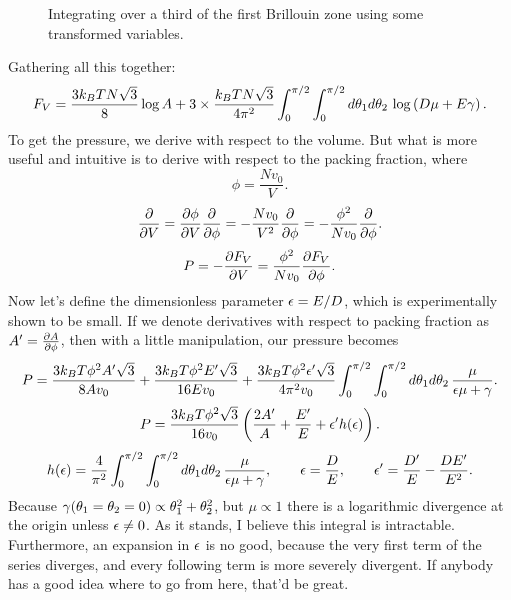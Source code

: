 \documentclass[12pt]{article}
\begin{document}
\begin{figure}
\centering
{}
\caption{Integrating over a third of the first Brillouin zone using some transformed variables.}
\end{figure}
Gathering all this together:
\[ F_V = \frac{3k_BTN\sqrt{3}}{8}\log A + 3\times \frac{k_BTN\sqrt{3}}{4\pi^2} \int_0^{\pi/2}\int_0^{\pi/2}d\theta_1 d\theta_2 \, \log\left(D\mu + E\gamma\right).\]
To get the pressure, we derive with respect to the volume. But what is more useful and intuitive is to derive with respect to the packing fraction, where
\[ \phi = \frac{Nv_0}{V}.\]
\[ \frac{\partial {}}{\partial {V}} = \frac{\partial {\phi}}{\partial {V}}\frac{\partial {}}{\partial {\phi}} = -\frac{Nv_0}{V^2}\frac{\partial {}}{\partial {\phi}} = -\frac{\phi^2}{Nv_0}\frac{\partial {}}{\partial {\phi}}.\]
\[ P = -\frac{\partial {F_V}}{\partial {V}} = \frac{\phi^2}{Nv_0}\frac{\partial {F_V}}{\partial {\phi}}.\]
Now let's define the dimensionless parameter $\epsilon = E/D$, which is experimentally shown to be small. If we denote derivatives with respect to packing fraction as $A' = \frac{\partial {A}}{\partial {\phi}}$, then with a little manipulation, our pressure becomes
\[ P = \frac{3k_BT\phi^2A'\sqrt{3}}{8Av_0} + \frac{3k_BT\phi^2 E'\sqrt{3}}{16Ev_0} + \frac{3k_BT\phi^2 \epsilon'\sqrt{3}}{4\pi^2v_0}\int_0^{\pi/2}\int_0^{\pi/2}d\theta_1d\theta_2\, \frac{\mu}{\epsilon\mu+\gamma}.\]
\[ P = \frac{3k_BT\phi^2\sqrt{3}}{16v_0} \left( \frac{2A'}{A} + \frac{E'}{E} + \epsilon' h(\epsilon)\right).\]
\[ h(\epsilon) = \frac{4}{\pi^2} \int_0^{\pi/2}\int_0^{\pi/2}d\theta_1d\theta_2\, \frac{\mu}{\epsilon\mu+\gamma}, \qquad \epsilon = \frac{D}{E}, \qquad \epsilon' = \frac{D'}{E} - \frac{DE'}{E^2}.\]
Because $\gamma(\theta_1=\theta_2=0) \propto \theta_1^2 + \theta_2^2$, but $\mu \propto 1$ there is a logarithmic divergence at the origin unless $\epsilon\neq 0$. As it stands, I believe this integral is intractable. Furthermore, an expansion in $\epsilon$ is no good, because the very first term of the series diverges, and every following term is more severely divergent. If anybody has a good idea where to go from here, that'd be great.
\end{document}
